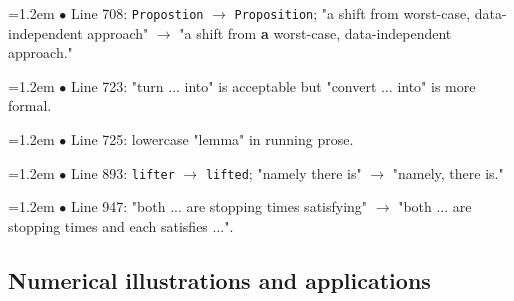 \documentclass[10pt,a4paper]{article}
\begin{document}
\par\smallskip\noindent\hangindent=1.2em $\bullet$ Line 708: \texttt{Propostion} $\to$ \texttt{Proposition}; "a shift from worst-case, data-independent approach" $\to$ "a shift from \textbf{a} worst-case, data-independent approach."
\par\smallskip\noindent\hangindent=1.2em $\bullet$ Line 723: "turn ... into" is acceptable but "convert ... into" is more formal.
\par\smallskip\noindent\hangindent=1.2em $\bullet$ Line 725: lowercase "lemma" in running prose.
\par\smallskip\noindent\hangindent=1.2em $\bullet$ Line 893: \texttt{lifter} $\to$ \texttt{lifted}; "namely there is" $\to$ "namely, there is."
\par\smallskip\noindent\hangindent=1.2em $\bullet$ Line 947: "both ... are stopping times satisfying" $\to$ "both ... are stopping times and each satisfies ...".

\subsection*{Numerical illustrations and applications}
\end{document}
